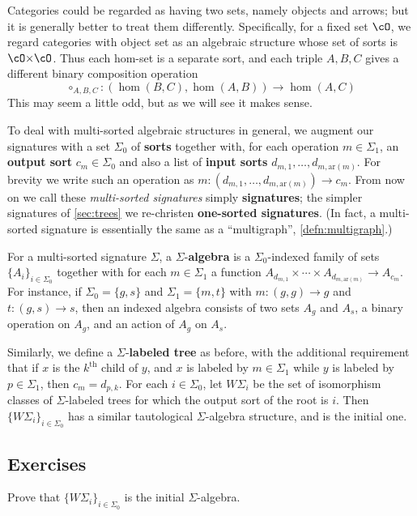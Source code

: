 \documentclass{book}
\def\ay{\mathrm{ar}}
\def\sig{\Sigma}
\let\map\hom
\let\hom\multimap
\begin{document}
Categories could be regarded as having two sets, namely objects and arrows; but it is generally better to treat them differently.
Specifically, for a fixed set $\cO$, we regard categories with object set \cO as an algebraic structure whose set of sorts is $\cO\times \cO$.
Thus each hom-set is a separate sort, and each triple $A,B,C$ gives a different binary composition operation
\[ \circ_{A,B,C} : (\map(B,C),\map(A,B)) \to \map(A,C) \]
This may seem a little odd, but as we will see it makes sense.

To deal with multi-sorted algebraic structures in general, we augment our signatures with a set $\sig_0$ of \textbf{sorts} together with, for each operation $m\in\sig_1$, an \textbf{output sort} $c_m\in\sig_0$ and also a list of \textbf{input sorts} $d_{m,1},\dots,d_{m,\ay(m)}$.
For brevity we write such an operation as $m:(d_{m,1},\dots,d_{m,\ay(m)}) \to c_m$.
From now on we call these \emph{multi-sorted signatures} simply \textbf{signatures}; the simpler signatures of \cref{sec:trees} we re-christen \textbf{one-sorted signatures}.
(In fact, a multi-sorted signature is essentially the same as a ``multigraph'', \cref{defn:multigraph}.)

For a multi-sorted signature $\sig$, a $\sig$-\textbf{algebra} is a $\sig_0$-indexed family of sets $\{A_i\}_{i\in\sig_0}$ together with for each $m\in\sig_1$ a function $A_{d_{m,1}}\times \cdots \times A_{d_{m,\ay(m)}} \to A_{c_m}$.
For instance, if $\sig_0 = \{g,s\}$ and $\sig_1=\{m,t\}$ with
$m : (g,g) \to g$ and $t : (g,s) \to s$,
then an indexed algebra consists of two sets $A_g$ and $A_s$, a binary operation on $A_g$, and an action of $A_g$ on $A_s$.

Similarly, we define a $\sig$-\textbf{labeled tree} as before, with the additional requirement that if $x$ is the $k^{\mathrm{th}}$ child of $y$, and $x$ is labeled by $m\in\sig_1$ while $y$ is labeled by $p\in\sig_1$, then $c_m = d_{p,k}$.
For each $i\in\sig_0$, let $W\sig_i$ be the set of isomorphism classes of $\sig$-labeled trees for which the output sort of the root is $i$.
Then $\{W\sig_i\}_{i\in\sig_0}$ has a similar tautological $\sig$-algebra structure, and is the initial one.

\subsection*{Exercises}

\begin{ex}\label{ex:multi-sorted-W}
  Prove that $\{W\sig_i\}_{i\in\sig_0}$ is the initial $\sig$-algebra.
\end{ex}
\end{document}
